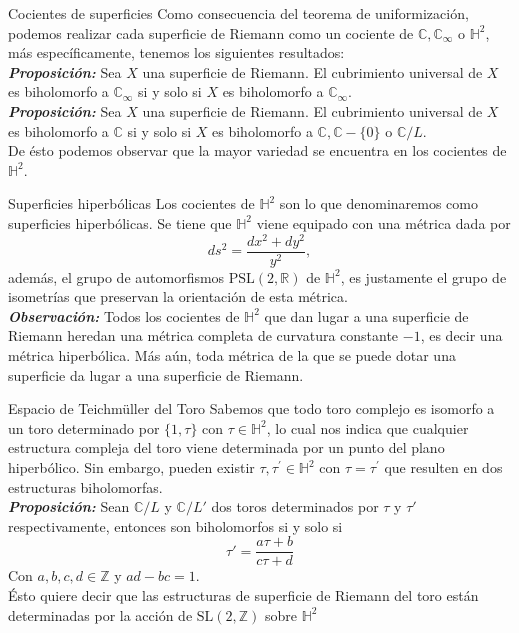 \documentclass[final]{beamer}
\newcommand\R{\ensuremath{\mathbb{R}}}
\newcommand\Z{\ensuremath{\mathbb{Z}}}
\newcommand\C{\ensuremath{\mathbb{C}}}
\newcommand\Hs{\ensuremath{\mathbb{H}}}
\newlength{\colwidth}
\newcommand{\defi}[1]{\textbf{\emph{#1}}}
\begin{document}
\begin{frame}[t,fragile]
\begin{columns}[t]
\begin{column}{\colwidth}
\begin{block}{Cocientes de superficies}
    Como consecuencia del teorema de uniformización, podemos realizar cada superficie de Riemann como un cociente de $\C,\C_\infty$ o $\Hs^2$, más específicamente, tenemos los siguientes resultados:\\
    \vspace{0.2cm}
    \defi{Proposición: }Sea $X$ una superficie de Riemann. El cubrimiento universal de $X$ es biholomorfo a $\C_\infty$ si y solo si $X$ es biholomorfo a $\C_\infty$.\\
    \vspace{0.2cm}
    \defi{Proposición: }Sea $X$ una superficie de Riemann. El cubrimiento universal de $X$ es biholomorfo a $\C$ si y solo si $X$ es biholomorfo a $\C,\C-\{0\}$ o $\C/L$.\\ 
    \vspace{0.2cm}
    De ésto podemos observar que la mayor variedad se encuentra en los cocientes de $\Hs^2$. 
\end{block}    
\begin{alertblock}{Superficies hiperbólicas}
Los cocientes de $\Hs^2$ son lo que denominaremos como superficies hiperbólicas. Se tiene que $\Hs^2$ viene equipado con una métrica dada por
$$ds^2=\dfrac{dx^2+dy^2}{y^2},$$
además, el grupo de automorfismos $\text{PSL}(2,\R)$ de $\Hs^2$, es justamente el grupo de isometrías que preservan la orientación de esta métrica.\\
\vspace{0.3cm}
\defi{Observación:} Todos los cocientes de $\Hs^2$ que dan lugar a una superficie de Riemann heredan una métrica completa de curvatura constante $-1$, es decir una métrica hiperbólica. Más aún, toda métrica de la que se puede dotar una superficie da lugar a una superficie de Riemann.
  \end{alertblock}
\begin{block}{Espacio de Teichmüller del Toro}
    Sabemos que todo toro complejo es isomorfo a un toro determinado por $\{1,\tau\}$ con $\tau \in \Hs^2$, lo cual nos indica que cualquier estructura compleja del toro viene determinada por un punto del plano hiperbólico. Sin embargo, pueden existir $\tau,\tau^{\prime} \in \Hs^2$ con $\tau = \tau^{\prime}$ que resulten en dos estructuras biholomorfas.\\ 
    \vspace{0.2cm}
    \defi{Proposición: } Sean $\C/L$ y $\C/L'$ dos toros determinados por $\tau$ y $\tau'$ respectivamente, entonces son biholomorfos si y solo si
        \[
            \tau' = \frac{a\tau + b}{c\tau + d}
        \]
        Con $a,b,c,d \in \Z$ y $ad-bc=1$.\\ 
    Ésto quiere decir que las estructuras de superficie de Riemann del toro están determinadas por la acción de $\text{SL}(2,\Z)$ sobre $\Hs^2$
\end{block}


\end{column}
\end{columns}
\end{frame}
\end{document}

